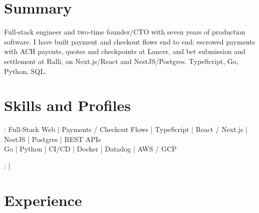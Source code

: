 \documentclass[print]{jack-resume}
\begin{document}
\pagecolor{darkmodeBackground}


\begin{minipage}[t][1cm][t]{.03\textwidth}
    \hfill
\end{minipage}

\section{Summary}
Full-stack engineer and two-time founder/CTO with seven years of production software. I have built payment and checkout flows end to end: escrowed payments with ACH payouts, quotes and checkpoints at Lancer, and bet submission and settlement at Ralli, on Next.js/React and NestJS/Postgres. TypeScript, Go, Python, SQL.
\sectionsep

\section{Skills and Profiles}
:
Full-Stack Web \hfill | \hfill
Payments / Checkout Flows \hfill | \hfill
TypeScript \hfill | \hfill
React / Next.js \hfill | \hfill
NestJS \hfill | \hfill
Postgres \hfill | \hfill
REST APIs \\
\hspace{1.0cm} Go \hfill | \hfill
Python \hfill | \hfill
CI/CD \hfill | \hfill
Docker \hfill | \hfill
Datadog \hfill | \hfill
AWS / GCP \\

\raggedright{
    :
      \href{https://www.linkedin.com/in/jack-sturtevant/}{ \ExternalLink} |
     \href{https://github.com/jacksturt}{ \ExternalLink}}

\section{Experience}
\end{document}
